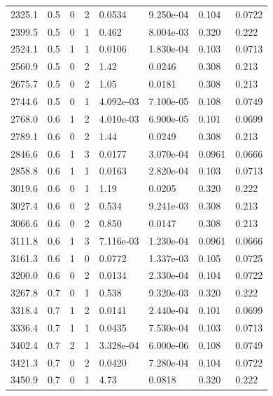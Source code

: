 \documentclass[preview]{standalone}
\begin{document}
{{{\begin{tabular}{L{1.2cm}C{1.2cm} C{0.3cm}C{0.5cm} C{1.4cm}C{1.4cm} C{1.4cm}C{1.4cm}}
  2325.1  &   0.5  & 0     &  2 &  0.0534  & 9.250e-04  & 0.104 &  0.0722   \\ 
  2399.5  &   0.5  & 0     &  1 &  0.462  & 8.004e-03  & 0.320 &  0.222   \\ 
  2524.1  &   0.5  & 1     &  1 &  0.0106  & 1.830e-04  & 0.103 &  0.0713   \\ 
  2560.9  &   0.5  & 0     &  2 &  1.42  & 0.0246  & 0.308 &  0.213   \\ 
  2675.7  &   0.5  & 0     &  2 &  1.05  & 0.0181  & 0.308 &  0.213   \\ 
  2744.6  &   0.5  & 0     &  1 &  4.092e-03  & 7.100e-05  & 0.108 &  0.0749   \\ 
  2768.0  &   0.6  & 1     &  2 &  4.010e-03  & 6.900e-05  & 0.101 &  0.0699   \\ 
  2789.1  &   0.6  & 0     &  2 &  1.44  & 0.0249  & 0.308 &  0.213   \\ 
  2846.6  &   0.6  & 1     &  3 &  0.0177  & 3.070e-04  & 0.0961 &  0.0666   \\ 
  2858.8  &   0.6  & 1     &  1 &  0.0163  & 2.820e-04  & 0.103 &  0.0713   \\ 
  3019.6  &   0.6  & 0     &  1 &  1.19  & 0.0205  & 0.320 &  0.222   \\ 
  3027.4  &   0.6  & 0     &  2 &  0.534  & 9.241e-03  & 0.308 &  0.213   \\ 
  3066.6  &   0.6  & 0     &  2 &  0.850  & 0.0147  & 0.308 &  0.213   \\ 
  3111.8  &   0.6  & 1     &  3 &  7.116e-03  & 1.230e-04  & 0.0961 &  0.0666   \\ 
  3161.3  &   0.6  & 1     &  0 &  0.0772  & 1.337e-03  & 0.105 &  0.0725   \\ 
  3200.0  &   0.6  & 0     &  2 &  0.0134  & 2.330e-04  & 0.104 &  0.0722   \\ 
  3267.8  &   0.7  & 0     &  1 &  0.538  & 9.320e-03  & 0.320 &  0.222   \\ 
  3318.4  &   0.7  & 1     &  2 &  0.0141  & 2.440e-04  & 0.101 &  0.0699   \\ 
  3336.4  &   0.7  & 1     &  1 &  0.0435  & 7.530e-04  & 0.103 &  0.0713   \\ 
  3402.4  &   0.7  & 2     &  1 &  3.328e-04  & 6.000e-06  & 0.108 &  0.0749   \\ 
  3421.3  &   0.7  & 0     &  2 &  0.0420  & 7.280e-04  & 0.104 &  0.0722   \\ 
  3450.9  &   0.7  & 0     &  1 &  4.73  & 0.0818  & 0.320 &  0.222   \\ 

\end{tabular}}}}
\end{document}
